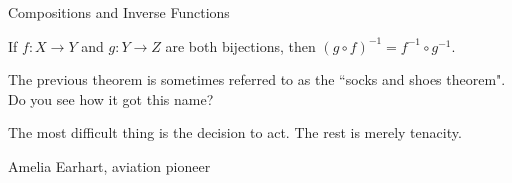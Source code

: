 \begin{section}{Compositions and Inverse Functions}
\begin{theorem}
If $f:X\to Y$ and $g:Y\to Z$ are both bijections, then $(g\circ f)^{-1}=f^{-1}\circ g^{-1}$.
\end{theorem}

The previous theorem is sometimes referred to as the ``socks and shoes theorem".  Do you see how it got this name?

\epigraph{The most difficult thing is the decision to act. The rest is merely tenacity.}{Amelia Earhart, aviation pioneer}

\end{section}